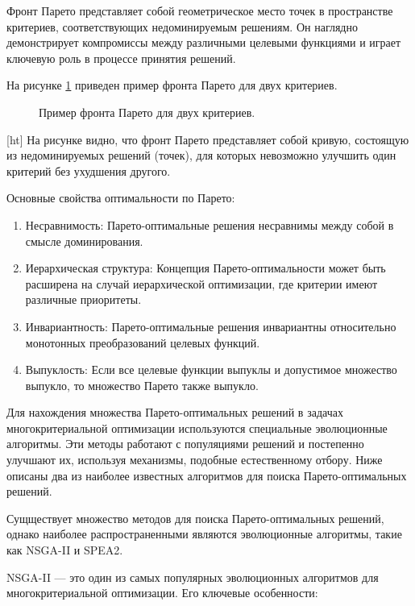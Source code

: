 Фронт Парето представляет собой геометрическое место точек \cite*{coello2007evolutionary} в
пространстве критериев, соответствующих недоминируемым решениям.
Он наглядно демонстрирует компромиссы между различными целевыми
функциями и играет ключевую роль в процессе принятия решений.

На рисунке \ref{fig:pareto_front_example} приведен пример фронта Парето для двух критериев.

\begin{figure}[ht]
    \caption{Пример фронта Парето для двух критериев.}\label{fig:pareto_front_example}
\end{figure}[ht]
На рисунке видно, что фронт Парето представляет собой кривую, состоящую из
недоминируемых решений
(точек), для которых невозможно улучшить один критерий без ухудшения другого.


Основные свойства оптимальности по Парето:
\begin{enumerate}
    \item Несравнимость: Парето-оптимальные решения несравнимы между собой в смысле доминирования.

    \item Иерархическая структура: Концепция Парето-оптимальности может быть расширена на случай иерархической оптимизации, где критерии имеют различные приоритеты.

    \item Инвариантность: Парето-оптимальные решения инвариантны относительно монотонных преобразований целевых функций.

    \item Выпуклость: Если все целевые функции выпуклы и допустимое множество выпукло, то множество Парето также выпукло.
\end{enumerate}

Для нахождения множества Парето-оптимальных решений в задачах многокритериальной оптимизации
используются специальные эволюционные алгоритмы. Эти методы работают с популяциями решений и
постепенно улучшают их, используя механизмы, подобные естественному отбору. Ниже описаны два из наиболее
известных алгоритмов для поиска Парето-оптимальных решений.

Сущществует множество методов для поиска Парето-оптимальных решений, однако наиболее
распространенными являются эволюционные алгоритмы, такие как NSGA-II и SPEA2.

NSGA-II — это один из самых популярных эволюционных алгоритмов для многокритериальной оптимизации. Его ключевые особенности:

